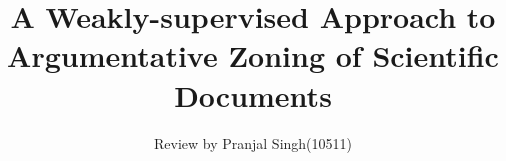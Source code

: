 \documentclass{article}
\title{\textbf{A Weakly-supervised Approach to Argumentative Zoning of Scientific Documents}}
\author{\normalsize Review by Pranjal Singh(10511)\\}
\begin{document}
\maketitle

\nocite{*}


\end{document}
